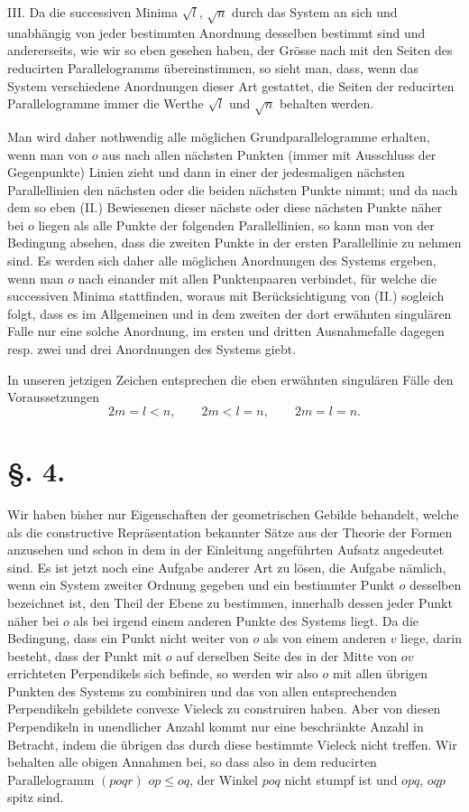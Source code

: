 \documentclass[11pt]{article}
\begin{document}
III. Da die successiven Minima $\sqrt l$, $\sqrt n$ durch das System an sich und unabhängig von jeder bestimmten Anordnung desselben bestimmt sind und andererseits, wie wir so eben gesehen haben, der Grösse nach mit den Seiten des reducirten Parallelogramms übereinstimmen, so sieht man, dass, wenn das System verschiedene Anordnungen dieser Art gestattet, die Seiten der reducirten Parallelogramme immer die Werthe $\sqrt l$ und $\sqrt n$ behalten werden.

Man wird daher nothwendig alle möglichen Grundparallelogramme erhalten, wenn man von $o$ aus nach allen nächsten Punkten (immer mit Ausschluss der Gegenpunkte) Linien zieht und dann in einer der jedesmaligen nächsten Parallellinien den nächsten oder die beiden nächsten Punkte nimmt; und da nach dem so eben (II.) Bewiesenen dieser nächste oder diese nächsten Punkte näher bei $o$ liegen als alle Punkte der folgenden Parallellinien, so kann man von der Bedingung absehen, dass die zweiten Punkte in der ersten Parallellinie zu nehmen sind. Es werden sich daher alle möglichen Anordnungen des Systems ergeben, wenn man $o$ nach einander mit allen Punktenpaaren verbindet, für welche die successiven Minima stattfinden, woraus mit Berücksichtigung von (II.) sogleich folgt, dass es im Allgemeinen und in dem zweiten der dort erwähnten singulären Falle nur eine solche Anordnung, im ersten und dritten Ausnahmefalle dagegen resp. zwei und drei Anordnungen des Systems giebt.

In unseren jetzigen Zeichen entsprechen die eben erwähnten singulären Fälle den Voraussetzungen
\[
 2m=l<n,
 \qquad 2m<l=n,
 \qquad 2m=l=n.
\]

\section*{§. 4.}

Wir haben bisher nur Eigenschaften der geometrischen Gebilde behandelt, welche als die constructive Repräsentation bekannter Sätze aus der Theorie der Formen anzusehen und schon in dem in der Einleitung angeführten Aufsatz angedeutet sind. Es ist jetzt noch eine Aufgabe anderer Art zu lösen, die Aufgabe nämlich, wenn ein System zweiter Ordnung gegeben und ein bestimmter Punkt $o$ desselben bezeichnet ist, den Theil der Ebene zu bestimmen, innerhalb dessen jeder Punkt näher bei $o$ als bei irgend einem anderen Punkte des Systems liegt. Da die Bedingung, dass ein Punkt nicht weiter von $o$ als von einem anderen $v$ liege, darin besteht, dass der Punkt mit $o$ auf derselben Seite des in der Mitte von $ov$ errichteten Perpendikels sich befinde, so werden wir also $o$ mit allen übrigen Punkten des Systems zu combiniren und das von allen entsprechenden Perpendikeln gebildete convexe Vieleck zu construiren haben. Aber von diesen Perpendikeln in unendlicher Anzahl kommt nur eine beschränkte Anzahl in Betracht, indem die übrigen das durch diese bestimmte Vieleck nicht treffen. Wir behalten alle obigen Annahmen bei, so dass also in dem reducirten Parallelogramm $(poqr)$ $op\le oq$, der Winkel $poq$ nicht stumpf ist und $opq$, $oqp$ spitz sind.
\end{document}
